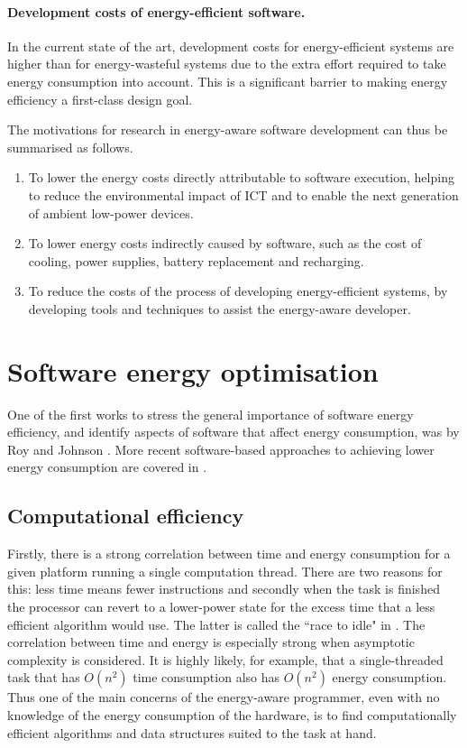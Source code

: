 \documentclass[11pt,oneside]{book}
\begin{document}
\paragraph{Development costs of energy-efficient software.} In the current state of the art, development costs for energy-efficient systems are higher than for energy-wasteful systems due to the extra effort required to take energy consumption into account. This is a significant barrier to making energy efficiency a first-class design goal.



The motivations for research in energy-aware software development can thus be summarised as follows.
\begin{enumerate}
\item
To lower the energy costs directly attributable to software execution, helping to reduce the environmental impact of ICT and to enable the next generation of ambient low-power devices.
\item
To lower  energy costs indirectly caused by software, such as the cost of cooling, power supplies, battery replacement and recharging.
\item
To reduce the costs of the process of developing energy-efficient systems, by developing tools and techniques to assist the energy-aware developer.
\end{enumerate}






\section{Software energy optimisation}
 
 
One of the first works to stress the general importance of software energy efficiency, and identify  aspects of software that affect energy consumption, was by Roy and Johnson \cite{Roy_Johnson_1997}. More recent software-based approaches to achieving lower energy consumption are covered in \cite{Larsson2011,Steigerwald_Agrawal_2011}. 



\subsection{Computational efficiency}\label{compeff}
Firstly, there is a strong correlation between time and energy consumption for a given platform running a single computation thread. There are two reasons for this: less time means fewer instructions and secondly when the task is finished the processor can revert to a lower-power state for the excess time that a less efficient algorithm would use. The latter is called the ``race to idle" in \cite{Steigerwald_Agrawal_2011}. The correlation between time and energy is especially strong when asymptotic complexity is considered.  It is highly likely, for example, that a single-threaded task that has $O(n^2)$ time consumption also has $O(n^2)$ energy consumption.  Thus one of the main concerns of the energy-aware programmer, even with no knowledge of the energy consumption of the hardware, is to find computationally efficient algorithms and data structures suited to the task at hand.
\end{document}
